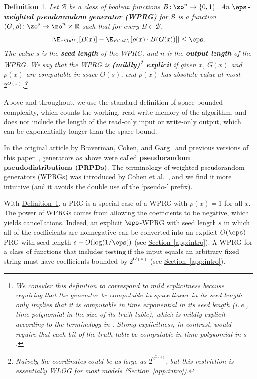 \documentclass[11pt]{article}
\newcommand{\expref}[2]{\texorpdfstring{\hyperref[#2]{#1~\ref{#2}}}{#1~\ref{#2}}}
\newtheorem{definition}[theorem]{Definition}
\newcommand{\R}{{\mathbb R}}
\newcommand{\ie}{i.\,e.}
\begin{document}
\begin{definition}\label{def:booleanWPRG}
	Let $\mathcal{B}$ be a class of boolean functions $B \colon \zo^n \to \{0, 1\}$. An \textbf{$\eps$-weighted pseudorandom generator (WPRG)} for $\mathcal{B}$ is a function $(G,\rho) \colon \zo^s \to \zo^n\times \R$ such that for every $B \in \mathcal{B}$,
	$$
		\left |\E_{x \la U_n}[B(x)] - \E_{x \la U_{s}}[\rho(x)\cdot B(G(x))]\right | \leq \eps.
	$$
	The value $s$ is the \textbf{seed length} of the WPRG, and $n$ is the \textbf{output length} of the WPRG. 
	We say that the WPRG is \textbf{(mildly)\footnote{We consider this definition to correspond to \emph{mild} explicitness because requiring that
	the generator be computable in space linear in its seed length only implies that it is computable in time exponential in its seed length (\ie, time polynomial in the size of its truth table), which is
	mildly explicit according to the terminology in \cite{vadhan2012pseudorandomness}.  \emph{Strong} explicitness, in contrast,
	would require that each bit of the truth table %
be %
computable in 
	time polynomial in $s$.} explicit} if given $x$, $G(x)$ and $\rho(x)$ are computable in space $O(s)$, and $\rho(x)$ 
	has absolute value at most $2^{O(s)}$.\footnote{Naively the coordinates could be as large as $2^{2^{O(s)}}$, but this restriction is essentially WLOG for most models (\expref{Section}{app:intro}).}  %
\end{definition}
Above and throughout, we use the standard definition of space-bounded complexity, which counts the working, read-write memory of the algorithm, and does not include the length of the read-only input or write-only output, which can be exponentially longer than the space bound.

In the original %
article by %
Braverman, Cohen, and Garg~\cite{BravermanCoGa18} and previous versions of this paper~\cite{PyneVa20}, generators as above were called \textbf{pseudorandom pseudodistributions (PRPDs)}.  The terminology of weighted pseudorandom generators (WPRGs) was introduced
by Cohen et al.~\cite{CohenDoReSbTa21}, and we find it more intuitive
(and it avoids the double use of the `pseudo-' prefix).

With \expref{Definition}{def:booleanWPRG}, a PRG is a special case of a WPRG with $\rho(x)=1$ for all $x$.  The power of WPRGs comes from allowing the coefficients
to be negative, which yields cancellations.  Indeed, an explicit $\eps$-WPRG with seed length $s$ in which all of the coefficients are nonnegative can be converted into an explicit $O(\eps)$-PRG with seed length $s+O(\log(1/\eps))$ (see \expref{Section}{app:intro}). A WPRG for a class of functions that includes testing if the input equals an arbitrary fixed string must have coefficients bounded by $2^{O(s)}$ (see \expref{Section}{app:intro}).
\end{document}
